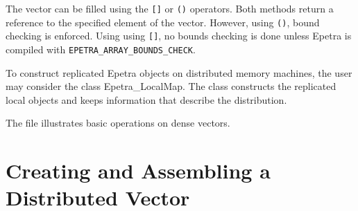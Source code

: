 The vector can be filled using the \verb![]! or \verb!()!  operators.
Both methods return a reference to the specified element of the vector.
However, using \verb!()!, bound checking is enforced. Using using
\verb![]!, no bounds checking is done unless Epetra is compiled with
\newline \verb!EPETRA_ARRAY_BOUNDS_CHECK!.

\begin{remark}
  To construct replicated Epetra objects on distributed memory machines,
  the user may consider the class Epetra\_LocalMap. The class constructs
  the replicated local objects and keeps information that describe the
  distribution.
\end{remark}

The file  illustrates basic operations on dense
vectors.


\section{Creating and Assembling a Distributed Vector}
\label{sec:distr_vec}

